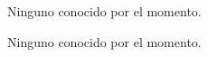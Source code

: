 
\begin{DoxyRefList}
\item[\label{bug__bug000001}%
\Hypertarget{bug__bug000001}%
File \hyperlink{complejo_8cc}{complejo.cc} ]Ninguno conocido por el momento.  
\item[\label{bug__bug000002}%
\Hypertarget{bug__bug000002}%
File \hyperlink{complejo__main_8cc}{complejo\+\_\+main.cc} ]Ninguno conocido por el momento. 
\end{DoxyRefList}